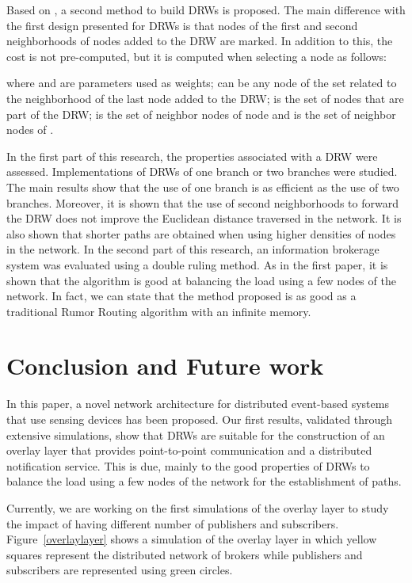 \documentclass[conference]{IEEEtran}
\begin{document}
Based on \cite{SENSORNETS14DRW}, a second method to build DRWs is proposed. The main difference with the first design presented for DRWs is that nodes of the first and second neighborhoods of nodes added to the DRW are marked. In addition to this, the cost is not pre-computed, but it is computed when selecting a node as follows:

where  and  are parameters used as weights;  can be any node of the set related to the neighborhood of the last node added to the DRW;  is the set of nodes that are part of the DRW;  is the set of neighbor nodes of node  and  is the set of neighbor nodes of .

In the first part of this research, the properties associated with a DRW were assessed. Implementations of DRWs of one branch or two branches were studied. The main results show that the use of one branch is as efficient as the use of two branches. Moreover, it is shown that the use of second neighborhoods to forward the DRW does not improve the Euclidean distance traversed in the network. It is also shown that shorter paths are obtained when using higher densities of nodes in the network. In the second part of this research, an information brokerage system was evaluated using a double ruling method. As in the first paper, it is shown that the algorithm is good at balancing the load using a few nodes of the network. In fact, we can state that the method proposed is as good as a traditional Rumor Routing algorithm \cite{Braginsky:2002:RRA:570738.570742} with an infinite memory.


\vspace{0.5em}
\section{Conclusion and Future work}
\label{sec:conclusion}

In this paper, a  novel network architecture for distributed event-based systems that use sensing devices has been proposed. Our first results, validated through extensive simulations, show that DRWs are suitable for the construction of an overlay layer that provides point-to-point communication and a distributed notification service. This is due, mainly to the good properties of DRWs to balance the load using a few nodes of the network for the establishment of paths. 

Currently, we are working on the first simulations of the overlay layer to study the impact of having different number of publishers and subscribers. Figure~\ref{overlaylayer} shows a simulation of the overlay layer in which yellow squares represent the distributed network of brokers while publishers and subscribers are represented using green circles.
\end{document}

